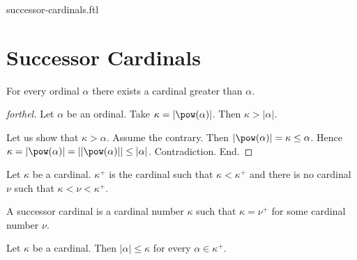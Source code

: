 \documentclass{naproche-library}
\begin{document}
\begin{smodule}{successor-cardinals.ftl}

  \section*{Successor Cardinals}
  
  \begin{lemma}[forthel,id=SET_THEORY_06_489264832709174]
    For every ordinal $\alpha$ there exists a cardinal greater than $\alpha$.
  \end{lemma}
  \begin{proof}[forthel]
    Let $\alpha$ be an ordinal.
    Take $\kappa = |\pow(\alpha)|$.
    Then $\kappa > |\alpha|$.

    Let us show that $\kappa > \alpha$.
      Assume the contrary.
      Then $|\pow(\alpha)|
        = \kappa
        \leq \alpha$.
      Hence $\kappa
        = |\pow(\alpha)|
        = ||\pow(\alpha)||
        \leq |\alpha|$.
      Contradiction.
    End.
  \end{proof}

  \begin{definition}[forthel,id=SET_THEORY_06_9568425123021254]
    Let $\kappa$ be a cardinal.
    $\kappa^+$ is the cardinal such that $\kappa < \kappa^+$ and there is no cardinal $\nu$ such that $\kappa < \nu < \kappa^+$.
  \end{definition}

  \begin{definition}[forthel,id=SET_THEORY_06_6818986081648640]
    A successor cardinal is a cardinal number $\kappa$ such that $\kappa = \nu^+$ for some cardinal number $\nu$.
  \end{definition}

  \begin{proposition}[forthel,id=SET_THEORY_06_5231202126545218]
    Let $\kappa$ be a cardinal.
    Then $|\alpha| \leq \kappa$ for every $\alpha \in \kappa^+$.
  \end{proposition}
\end{smodule}
\end{document}
